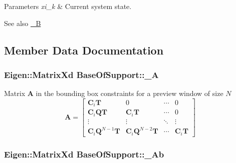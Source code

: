 \begin{DoxyParams}{\-Parameters}
{\em xi\-\_\-k} & \-Current system state.\\
\hline
\end{DoxyParams}
\begin{DoxySeeAlso}{\-See also}
\hyperlink{classBaseOfSupport_adfa70199064a50d9d7aea9a6d4b13246}{\-\_\-\-B} 
\end{DoxySeeAlso}


\subsection{\-Member \-Data \-Documentation}
\hypertarget{classBaseOfSupport_a54a35d087a8dfaee9a27d025d46f706d}{
\subsubsection[{\-\_\-\-A}]{\setlength{\rightskip}{0pt plus 5cm}\-Eigen\-::\-Matrix\-Xd {\bf \-Base\-Of\-Support\-::\-\_\-\-A}}}\label{classBaseOfSupport_a54a35d087a8dfaee9a27d025d46f706d}
\-Matrix $\mathbf{A}$ in the bounding box constraints for a preview window of size $N$ \[ \mathbf{A} = \left[\begin{array}{cccc} \mathbf{C}_i\mathbf{T} & 0 & \cdots & 0 \\ \mathbf{C}_i\mathbf{Q}\mathbf{T} & \mathbf{C}_i\mathbf{T} & \cdots & 0 \\ \vdots & \vdots & \ddots & \vdots \\ \mathbf{C}_i\mathbf{Q}^{N-1}\mathbf{T} & \mathbf{C}_i\mathbf{Q}^{N-2}\mathbf{T} & \cdots & \mathbf{C}_i\mathbf{T} \end{array}\right] \] \hypertarget{classBaseOfSupport_a42d531cd89c34cf8821c5cdeff321bc1}{
\subsubsection[{\-\_\-\-Ab}]{\setlength{\rightskip}{0pt plus 5cm}\-Eigen\-::\-Matrix\-Xd {\bf \-Base\-Of\-Support\-::\-\_\-\-Ab}}}\label{classBaseOfSupport_a42d531cd89c34cf8821c5cdeff321bc1}
